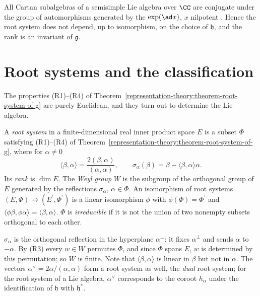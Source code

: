 \begin{remark}\label{representation-theory:remark-conjugacy}
All Cartan subalgebras of a semisimple Lie algebra over $\CC$ are conjugate under the group of automorphisms generated by the $\exp(\ad x)$, $x$ nilpotent \cite[Section 16]{humphreys-lie}.
Hence the root system does not depend, up to isomorphism, on the choice of $\mathfrak{h}$, and the rank is an invariant of $\mathfrak{g}$.
\end{remark}

\section{Root systems and the classification}\label{representation-theory:section-root-systems}

The properties (R1)--(R4) of Theorem~\ref{representation-theory:theorem-root-system-of-g} are purely Euclidean, and they turn out to determine the Lie algebra.

\begin{definition}\label{representation-theory:definition-root-system}
A \emph{root system} in a finite-dimensional real inner product space $E$ is a subset $\Phi$ satisfying (R1)--(R4) of Theorem~\ref{representation-theory:theorem-root-system-of-g},
where for $\alpha \neq 0$
\[
\langle\beta, \alpha\rangle = \frac{2(\beta, \alpha)}{(\alpha, \alpha)}, \qquad \sigma_\alpha(\beta) = \beta - \langle\beta, \alpha\rangle\alpha .
\]
Its \emph{rank} is $\dim E$. The \emph{Weyl group} $W$ is the subgroup of the orthogonal group of $E$ generated by the reflections $\sigma_\alpha$, $\alpha \in \Phi$. An isomorphism of root
systems $(E, \Phi) \to (E^{\prime}, \Phi^{\prime})$ is a linear isomorphism $\phi$ with $\phi(\Phi) = \Phi^{\prime}$ and $\langle\phi\beta, \phi\alpha\rangle = \langle\beta, \alpha\rangle$.
$\Phi$ is \emph{irreducible} if it is not the union of two nonempty subsets orthogonal to each other.
\end{definition}

$\sigma_\alpha$ is the orthogonal reflection in the hyperplane $\alpha^\perp$: it fixes $\alpha^\perp$ and sends $\alpha$ to $-\alpha$. By (R3) every $w \in W$ permutes $\Phi$, and since
$\Phi$ spans $E$, $w$ is determined by this permutation; so $W$ is finite. Note that $\langle\beta, \alpha\rangle$ is linear in $\beta$ but not in $\alpha$. The vectors
$\alpha^\vee = 2\alpha/(\alpha, \alpha)$ form a root system as well, the \emph{dual} root system; for the root system of a Lie algebra, $\alpha^\vee$ corresponds to the coroot $h_\alpha$
under the identification of $\mathfrak{h}$ with $\mathfrak{h}^*$.

